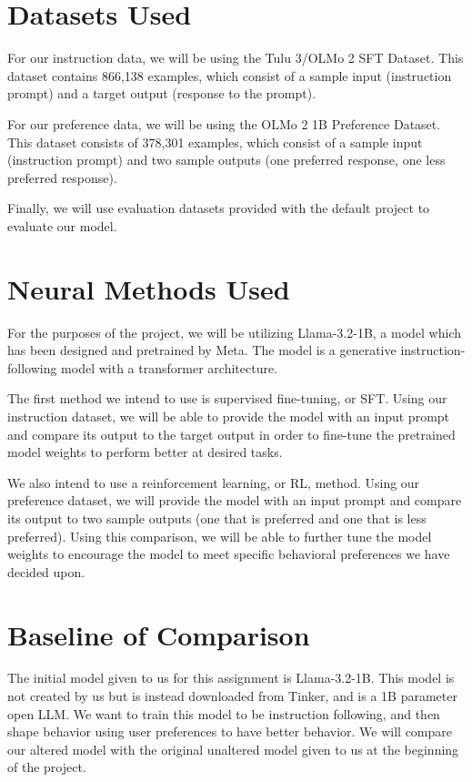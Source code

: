 \documentclass[11pt]{article}
\begin{document}
\section{Datasets Used}

For our instruction data, we will be using the Tulu 3/OLMo 2 SFT Dataset. This dataset contains 866,138 examples, which consist of a sample input (instruction prompt) and a target output (response to the prompt).

For our preference data, we will be using the OLMo 2 1B Preference Dataset. This dataset consists of 378,301 examples, which consist of a sample input (instruction prompt) and two sample outputs (one preferred response, one less preferred response). 

Finally, we will use evaluation datasets provided with the default project to evaluate our model. 



\section{Neural Methods Used}

For the purposes of the project, we will be utilizing Llama-3.2-1B, a model which has been designed and pretrained by Meta. The model is a generative instruction-following model with a transformer architecture. 

The first method we intend to use is supervised fine-tuning, or SFT. Using our instruction dataset, we will be able to provide the model with an input prompt and compare its output to the target output in order to fine-tune the pretrained model weights to perform better at desired tasks. 

We also intend to use a reinforcement learning, or RL, method. Using our preference dataset, we will provide the model with an input prompt and compare its output to two sample outputs (one that is preferred and one that is less preferred). Using this comparison, we will be able to further tune the model weights to encourage the model to meet specific behavioral preferences we have decided upon.


\section{Baseline of Comparison}
The initial model given to us for this assignment is Llama-3.2-1B. This model is not created by us but is instead downloaded from Tinker, and is a 1B parameter open LLM. We want to train this model to be instruction following, and then shape behavior using user preferences to have better behavior. We will compare our altered model with the original unaltered model given to us at the beginning of the project.
\end{document}
